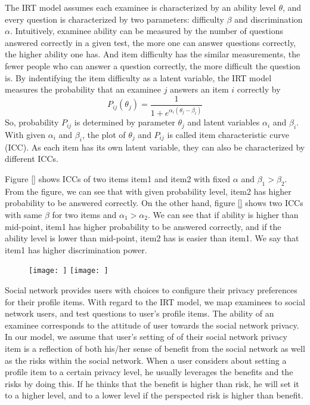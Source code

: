\documentclass[a4paper]{article}
\begin{document}
The IRT model assumes each examinee is characterized by an ability
level $\theta$, and every question is characterized by two parameters:
difficulty $\beta$ and discrimination $\alpha$. Intuitively, examinee
ability can be measured by the number of questions answered correctly
in a given test, 
the more one can answer questions correctly, the higher ability
one has. And item difficulty has the similar measurements, the fewer
people who can answer a question correctly, the more difficult the
question is. By indentifying the item difficulty as a latent variable,
the IRT model measures the probability that an examinee $j$ answers an
item $i$ correctly by 
\begin{equation}
  P_{ij}(\theta_j) = \frac{1}{1+e^{\alpha_i(\theta_j-\beta_i)}}
\end{equation}
So, probability $P_{ij}$ is determined by parameter $\theta_j$ and
latent variables $\alpha_i$ and $\beta_i$. With given $\alpha_i$ and
$\beta_i$, the plot of $\theta_j$ and $P_{ij}$ is called item
characteristic curve (ICC). As each item has its own latent variable,
they can also be characterized by different ICCs. 

Figure \ref{} shows ICCs of two items item1 and item2 with fixed
$\alpha$ and $\beta_1 > \beta_2$. From the figure, we can see that
with given probability level, item2 has higher probability to be
answered correctly. On the other hand, figure \ref{} shows two ICCs
with same $\beta$ for two items and $\alpha_1 > \alpha_2$. We can see
that if ability is higher than mid-point, item1 has higher probability
to be answered correctly, and if the ability level is lower than
mid-point, item2 has is easier than item1. We say that item1 has
higher discrimination power. 

\begin{figure}[h]
  \centering
  \texttt{[image: ]} 
  \texttt{[image: ]} 
\end{figure}

Social network provides users with choices to configure their privacy
preferences for their profile items. With regard to the IRT model, we
map examinees to social network users, and test questions to user's
profile items. The ability of an examinee corresponds to the attitude
of user towards the social network privacy. In our model, we assume
that user's setting of of their social network privacy item is a
reflection of both his/her sense of benefit from the social network
as well as the risks within the social network. When a user considers
about setting a profile item to a certain privacy level, he usually
leverages the benefits and the risks by doing this. If he thinks that
the benefit is higher than risk, he will set it to a higher level, and
to a lower level if the perspected risk is higher than benefit. 
\end{document}
